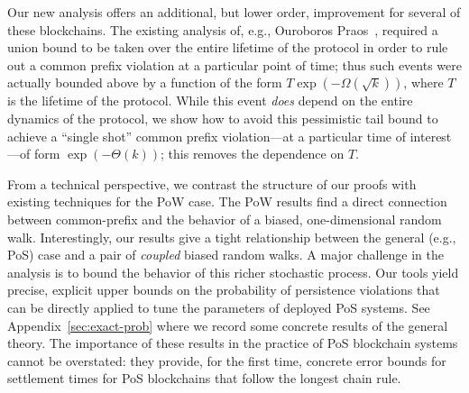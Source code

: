 Our new analysis offers an additional, but lower order, improvement for
several of these blockchains. The existing analysis of, e.g.,
Ouroboros Praos~\cite{DBLP:conf/eurocrypt/DavidGKR18}, required a
union bound to be taken over the entire lifetime of the protocol in
order to rule out a common prefix violation at a particular point of
time; thus such events were actually bounded above by a function of
the form $T \exp(-\Omega(\sqrt{k}))$, where $T$ is the lifetime of the
protocol. While this event \emph{does} depend on the entire dynamics
of the protocol, we show how to avoid this pessimistic tail bound to
achieve a ``single shot'' common prefix violation---at a particular
time of interest---of form $\exp(-\Theta(k))$; this removes the
dependence on $T$.

From a technical perspective, we contrast the structure of our proofs
with existing techniques for the PoW case. The PoW results find a
direct connection between common-prefix and the behavior of a biased,
one-dimensional random walk. Interestingly, our results give a tight
relationship between the general (e.g., PoS) case and a pair of
\emph{coupled} biased random walks. A major challenge in the analysis
is to bound the behavior of this richer stochastic process.  Our tools
yield precise, explicit upper bounds on the probability of persistence
violations that can be directly applied to tune the parameters of
deployed PoS systems. See Appendix~\ref{sec:exact-prob} where we
record some concrete results of the general theory. The importance of
these results in the practice of PoS blockchain systems cannot be
overstated: they provide, for the first time, concrete error bounds
for settlement times for PoS blockchains that follow the longest chain
rule.



